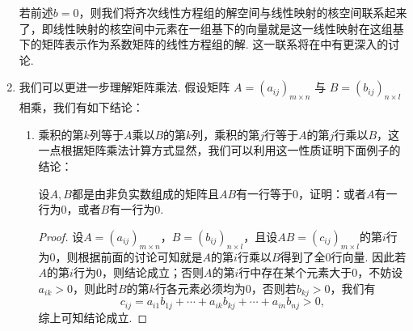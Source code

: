 \begin{enumerate}
          若前述$b=0$，则我们将齐次线性方程组的解空间与线性映射的核空间联系起来了，即线性映射的核空间中元素在一组基下的向量就是这一线性映射在这组基下的矩阵表示作为系数矩阵的线性方程组的解. 这一联系将在中有更深入的讨论.

    \item 我们可以更进一步理解矩阵乘法. 假设矩阵 $A = (a_{ij})_{m \times n}$ 与 $B = (b_{ij})_{n \times l}$ 相乘，我们有如下结论：
          \begin{enumerate}
              \item 乘积的第$k$列等于$A$乘以$B$的第$k$列，乘积的第$j$行等于$A$的第$j$行乘以$B$，这一点根据矩阵乘法计算方式显然，我们可以利用这一性质证明下面例子的结论：
                    \begin{example}{}{}
                        设$A,B$都是由非负实数组成的矩阵且$AB$有一行等于0，证明：或者$A$有一行为0，或者$B$有一行为0.
                    \end{example}
                    \begin{proof}
                        设$A=(a_{ij})_{m\times n}$，$B=(b_{ij})_{n\times l}$，且设$AB=(c_{ij})_{m\times l}$的第$i$行为0，则根据前面的讨论可知就是$A$的第$i$行乘以$B$得到了全0行向量. 因此若$A$的第$i$行为0，则结论成立；否则$A$的第$i$行中存在某个元素大于0，不妨设$a_{ik}>0$，则此时$B$的第$k$行各元素必须均为0，否则若$b_{kj}>0$，我们有
                        \[c_{ij}=a_{i1}b_{1j}+\cdots+a_{ik}b_{kj}+\cdots+a_{in}b_{nj}>0,\]
                        综上可知结论成立.
                    \end{proof}


\end{enumerate}
\end{enumerate}
